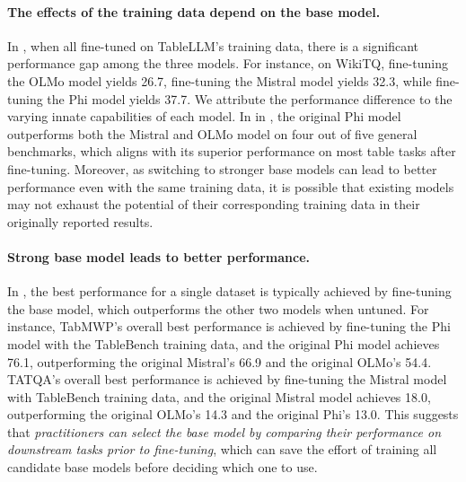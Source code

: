 \documentclass[11pt]{article}
\begin{document}
\paragraph{The effects of the training data depend on the base model.}
In , when all fine-tuned on TableLLM's training data, there is a significant performance gap among the three models.
For instance, on WikiTQ, fine-tuning the OLMo model yields 26.7, fine-tuning the Mistral model yields 32.3, while fine-tuning the Phi model yields 37.7.
We attribute the performance difference to the varying innate capabilities of each model.
In  in , the original Phi model outperforms both the Mistral and OLMo model on four out of five general benchmarks, which aligns with its superior performance on most table tasks after fine-tuning.
Moreover, as switching to stronger base models can lead to better performance even with the same training data, it is possible that existing models may not exhaust the potential of their corresponding training data in their originally reported results.

\paragraph{Strong base model leads to better performance.}
In , the best performance for a single dataset is typically achieved by fine-tuning the base model, which outperforms the other two models when untuned.
For instance, TabMWP's overall best performance is achieved by fine-tuning the Phi model with the TableBench training data, and the original Phi model achieves 76.1, outperforming the original Mistral's 66.9 and the original OLMo's 54.4.
TATQA's overall best performance is achieved by fine-tuning the Mistral model with TableBench training data, and the original Mistral model achieves 18.0, outperforming the original OLMo's 14.3 and the original Phi's 13.0.
This suggests that \textit{practitioners can select the base model by comparing their performance on downstream tasks prior to fine-tuning}, which can save the effort of training all candidate base models before deciding which one to use.
\end{document}
